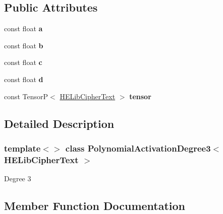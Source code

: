 \subsection*{Public Attributes}
\begin{DoxyCompactItemize}
\item 
\mbox{\label{classPolynomialActivationDegree3_3_01HELibCipherText_01_4_a905467b5a68207409cf49dc429df087a}} 
const float {\bfseries a}
\item 
\mbox{\label{classPolynomialActivationDegree3_3_01HELibCipherText_01_4_aab5584a6d58a21227a0999eeefad7da0}} 
const float {\bfseries b}
\item 
\mbox{\label{classPolynomialActivationDegree3_3_01HELibCipherText_01_4_a3e67939b8979a1c064d02311dcb4c374}} 
const float {\bfseries c}
\item 
\mbox{\label{classPolynomialActivationDegree3_3_01HELibCipherText_01_4_a89a4d05e848b09366efe167d3f19e39c}} 
const float {\bfseries d}
\item 
\mbox{\label{classPolynomialActivationDegree3_3_01HELibCipherText_01_4_a30b7796f8dec7ef77b549ce6c641d5aa}} 
const TensorP$<$ \hyperlink{classHELibCipherText}{H\+E\+Lib\+Cipher\+Text} $>$ {\bfseries tensor}
\end{DoxyCompactItemize}


\subsection{Detailed Description}
\subsubsection*{template$<$$>$\newline
class Polynomial\+Activation\+Degree3$<$ H\+E\+Lib\+Cipher\+Text $>$}

Degree 3 

\subsection{Member Function Documentation}
\mbox{\label{classPolynomialActivationDegree3_3_01HELibCipherText_01_4_ae9d94218a926c13f7388f7acc6c94177}} 
